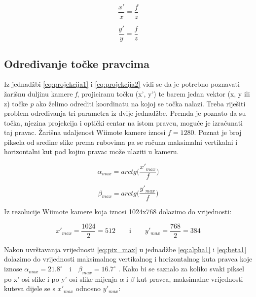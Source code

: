 \documentclass[times, utf8, diplomski]{fer}
\begin{document}
\begin{equation}
\frac{x'}{x} = \frac{f}{z}
\label{eq:projekcija1}
\end{equation}

\begin{equation}
\frac{y'}{y} = \frac{f}{z}
\label{eq:projekcija2}
\end{equation}

\subsection{Određivanje točke pravcima}
Iz jednadžbi \ref{eq:projekcija1} i \ref{eq:projekcija2} vidi se da je potrebno poznavati žarišnu duljinu kamere \textit{f}, projiciranu točku (x', y') te barem jedan vektor (x, y ili z) točke \textit{p} ako želimo odrediti koordinatu na kojoj se točka nalazi. Treba riješiti problem određivanja tri parametra iz dvije jednadžbe. Premda je poznato da su točka, njezina projekcija i optički centar na istom pravcu, moguće je izračunati taj pravac. Žarišna udaljenost Wiimote kamere iznosi $f=1280$. Poznat je broj piksela od sredine slike prema rubovima pa se računa maksimalni vertikalni i horizontalni kut pod kojim pravac može ulaziti u kameru.

\begin{equation}
\alpha_{max} = arctg\bigg(\frac{x'_{max}}{f}\bigg)
\label{eq:alpha1}
\end{equation}

\begin{equation}
\beta_{max} = arctg\bigg(\frac{y'_{max}}{f}\bigg)
\label{eq:beta1}
\end{equation}

\vspace{5mm}

Iz rezolucije Wiimote kamere koja iznosi 1024x768 dolazimo do vrijednosti:

\begin{equation}
x'_{max} = \frac{1024}{2} = 512 \qquad\text{i}\qquad y'_{max} = \frac{768}{2} = 384
\label{eq:pix_max}
\end{equation}

\vspace{5mm}

Nakon uvrštavanja vrijednosti \ref{eq:pix_max} u jednadžbe \ref{eq:alpha1} i \ref{eq:beta1} dolazimo do vrijednosti maksimalnog vertikalnog i horizontalnog kuta pravca koje iznose $\alpha_{max} = 21.8^{\circ} \quad\text{i}\quad \beta_{max} = 16.7^{\circ}$ . Kako bi se saznalo za koliko svaki piksel po x' osi slike i po y' osi slike mijenja $\alpha$ i $\beta$ kut pravca, maksimalne vrijednosti kuteva dijele se s $x'_{max}$ odnosno $y'_{max}$:
\end{document}
